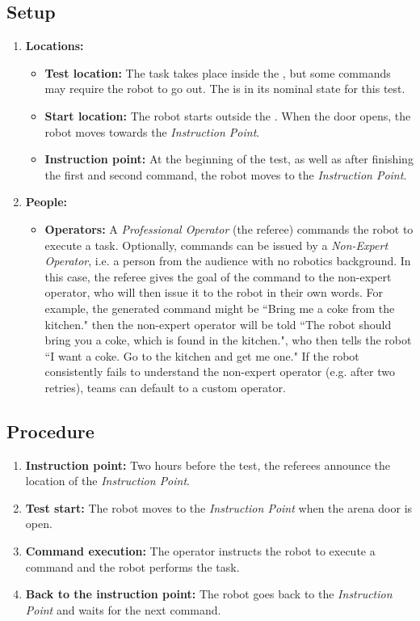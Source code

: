 \subsection*{Setup}
\begin{enumerate}
    \item \textbf{Locations:}
		\begin{itemize}
			\item \textbf{Test location:} The task takes place inside the \Arena{}, but some commands may require the robot to go out. The \Arena{} is in its nominal state for this test.
			\item \textbf{Start location:} The robot starts outside the \Arena{}. When the door opens, the robot moves towards the \textit{Instruction Point}.
			\item \textbf{Instruction point:} At the beginning of the test, as well as after finishing the first and second command, the robot moves to the \textit{Instruction Point}.
		\end{itemize}
	\item \textbf{People:}
		\begin{itemize}
			\item \textbf{Operators:} A \emph{Professional Operator} (the referee) commands the robot to execute a task.
			Optionally, commands can be issued by a \emph{Non-Expert Operator}, i.e. a person from the audience with no robotics background.
			In this case, the referee gives the goal of the command to the non-expert operator, who will then issue it to the robot in their own words. For example, the generated command might be ``Bring me a coke from the kitchen." then the non-expert operator will be told ``The robot should bring you a coke, which is found in the kitchen.", who then tells the robot ``I want a coke. Go to the kitchen and get me one."
			If the robot consistently fails to understand the non-expert operator (e.g. after two retries), teams can default to a custom operator.
		\end{itemize}
\end{enumerate}


\subsection*{Procedure}
\begin{enumerate}[nosep]
	\item \textbf{Instruction point:} Two hours before the test, the referees announce the location of the \textit{Instruction Point}.
	\item \textbf{Test start:} The robot moves to the \textit{Instruction Point} when the arena door is open.
	\item \textbf{Command execution:} The operator instructs the robot to execute a command and the robot performs the task.
	\item \textbf{Back to the instruction point:} The robot goes back to the \textit{Instruction Point} and waits for the next command.
\end{enumerate}


